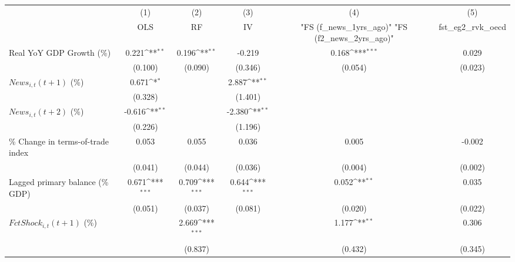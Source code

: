 {
\def\sym#1{\ifmmode^{#1}\else\(^{#1}\)\fi}
\begin{tabular}{l*{5}{c}}
\toprule
                    &\multicolumn{1}{c}{(1)}&\multicolumn{1}{c}{(2)}&\multicolumn{1}{c}{(3)}&\multicolumn{1}{c}{(4)}&\multicolumn{1}{c}{(5)}\\
                    &\multicolumn{1}{c}{OLS}&\multicolumn{1}{c}{RF}&\multicolumn{1}{c}{IV}&\multicolumn{1}{c}{ "FS (f_news_1yrs_ago)"  "FS (f2_news_2yrs_ago)" }&\multicolumn{1}{c}{fst_eg2_rvk_oecd}\\
\midrule
Real YoY GDP Growth (\%)&       0.221\sym{**} &       0.196\sym{**} &      -0.219         &       0.168\sym{***}&       0.029         \\
                    &     (0.100)         &     (0.090)         &     (0.346)         &     (0.054)         &     (0.023)         \\
\addlinespace
$ News_{i,t}(t+1)$ (\%)&       0.671\sym{*}  &                     &       2.887\sym{**} &                     &                     \\
                    &     (0.328)         &                     &     (1.401)         &                     &                     \\
\addlinespace
$ News_{i,t}(t+2)$ (\%)&      -0.616\sym{**} &                     &      -2.380\sym{**} &                     &                     \\
                    &     (0.226)         &                     &     (1.196)         &                     &                     \\
\addlinespace
\% Change in terms-of-trade index&       0.053         &       0.055         &       0.036         &       0.005         &      -0.002         \\
                    &     (0.041)         &     (0.044)         &     (0.036)         &     (0.004)         &     (0.002)         \\
\addlinespace
Lagged primary balance (\% GDP)&       0.671\sym{***}&       0.709\sym{***}&       0.644\sym{***}&       0.052\sym{**} &       0.035         \\
                    &     (0.051)         &     (0.037)         &     (0.081)         &     (0.020)         &     (0.022)         \\
\addlinespace
$ FctShock_{i,t}(t+1)$ (\%)&                     &       2.669\sym{***}&                     &       1.177\sym{**} &       0.306         \\
                    &                     &     (0.837)         &                     &     (0.432)         &     (0.345)         \\

\end{tabular}}
